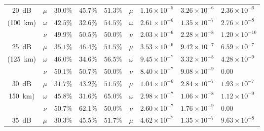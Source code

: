\begin{table}[htbp]
\begin{tabular}{cclllclll}
\SI{20}{dB}   &  $\mu$        & $30.0\%$                  & $45.7\%$                  & $51.3\%$                  & $\mu$        & $1.16\times10^{-5}$     & $3.26\times10^{-6}$     & $2.36\times10^{-6}$     \\
(\SI{100}{\km}) & $\omega$        & $42.5\%$                  & $32.6\%$                  & $54.5\%$                  & $\omega$        & $2.61\times10^{-6}$     & $1.35\times10^{-7}$     & $2.76\times10^{-8}$     \\
        & $\nu$        & $49.9\%$                  & $50.5\%$                  & $50.0\%$                  & $\nu$        & $2.03\times10^{-6}$     & $2.28\times10^{-8}$     & $1.20\times10^{-10}$    \vspace{5pt}\\
        \SI{25}{dB}  & $\mu$        & $35.1\%$                  & $46.4\%$                  & $51.5\%$                  & $\mu$        & $3.53\times10^{-6}$     & $9.42\times10^{-7}$     & $6.59\times10^{-7}$     \\
(\SI{125}{\km}) & $\omega$        & $46.0\%$                  & $34.6\%$                  & $56.5\%$                  & $\omega$        & $9.45\times10^{-7}$     & $3.32\times10^{-8}$     & $4.28\times10^{-9}$\\
        & $\nu$        & $50.1\%$                  & $50.7\%$                  & $50.0\%$                  & $\nu$        & $8.40\times10^{-7}$     & $9.08\times10^{-9}$     & $0.00$     \vspace{5pt}\\
\SI{30}{dB} & $\mu$        & $31.7\%$                  & $43.2\%$                  & $51.5\%$                  & $\mu$        & $1.04\times10^{-6}$     & $2.84\times10^{-7}$     & $1.93\times10^{-7}$     \\
\SI{150}{\km}) & $\omega$        & $45.8\%$                  & $31.6\%$                  & $65.0\%$                  & $\omega$        & $2.98\times10^{-7}$     & $1.06\times10^{-8}$     & $1.12\times10^{-9}$     \\
        & $\nu$        & $50.7\%$                  & $62.1\%$                  & $50.0\%$                  & $\nu$        & $2.60\times10^{-7}$     & $1.76\times10^{-9}$     & $0.00$                  \vspace{5pt}\\
        \SI{35}{dB}  & $\mu$        & $30.3\%$                  & $45.5\%$                  & $51.7\%                 $ & $\mu$        & $4.62\times10^{-7}$     & $1.35\times10^{-7}$     & $9.63\times10^{-8}$     \\

\end{tabular}
\end{table}
